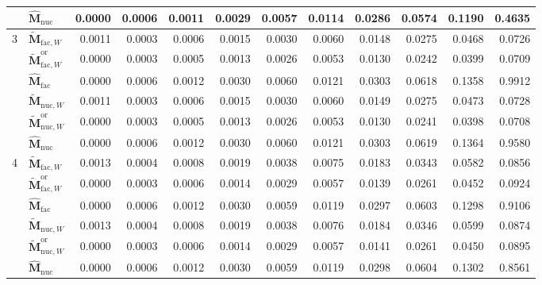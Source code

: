 \documentclass[numsec,webpdf,modern,large,namedate]{oup-authoring-template}
\theoremstyle{plain}
\theoremstyle{remark}
\newcommand{\M}{\bm{M}}
\begin{document}
\begin{table}[!htbp]
{\begin{tabular}{@{}llrrrrrrrrrr@{}}
 & $\widehat{\M}_{\mathrm{nuc}}$ & 0.0000 & 0.0006 & 0.0011 & 0.0029 & 0.0057 & 0.0114 & 0.0286 & 0.0574 & 0.1190 & 0.4635 \\
\midrule
\multirow{6}{*}{3} & $\widetilde{\M}_{\mathrm{fac},W}$ & 0.0011 & 0.0003 & 0.0006 & 0.0015 & 0.0030 & 0.0060 & 0.0148 & 0.0275 & 0.0468 & 0.0726 \\
 & $\widetilde{\M}_{\mathrm{fac},W}^{\mathrm{or}}$ & 0.0000 & 0.0003 & 0.0005 & 0.0013 & 0.0026 & 0.0053 & 0.0130 & 0.0242 & 0.0399 & 0.0709 \\
 & $\widehat{\M}_{\mathrm{fac}}$ & 0.0000 & 0.0006 & 0.0012 & 0.0030 & 0.0060 & 0.0121 & 0.0303 & 0.0618 & 0.1358 & 0.9912 \\
 & $\widetilde{\M}_{\mathrm{nuc},W}$ & 0.0011 & 0.0003 & 0.0006 & 0.0015 & 0.0030 & 0.0060 & 0.0149 & 0.0275 & 0.0473 & 0.0728 \\
 & $\widetilde{\M}_{\mathrm{nuc},W}^{\mathrm{or}}$ & 0.0000 & 0.0003 & 0.0005 & 0.0013 & 0.0026 & 0.0053 & 0.0130 & 0.0241 & 0.0398 & 0.0708 \\
 & $\widehat{\M}_{\mathrm{nuc}}$ & 0.0000 & 0.0006 & 0.0012 & 0.0030 & 0.0060 & 0.0121 & 0.0303 & 0.0619 & 0.1364 & 0.9580 \\
\midrule
\multirow{6}{*}{4} & $\widetilde{\M}_{\mathrm{fac},W}$ & 0.0013 & 0.0004 & 0.0008 & 0.0019 & 0.0038 & 0.0075 & 0.0183 & 0.0343 & 0.0582 & 0.0856 \\
 & $\widetilde{\M}_{\mathrm{fac},W}^{\mathrm{or}}$ & 0.0000 & 0.0003 & 0.0006 & 0.0014 & 0.0029 & 0.0057 & 0.0139 & 0.0261 & 0.0452 & 0.0924 \\
 & $\widehat{\M}_{\mathrm{fac}}$ & 0.0000 & 0.0006 & 0.0012 & 0.0030 & 0.0059 & 0.0119 & 0.0297 & 0.0603 & 0.1298 & 0.9106 \\
 & $\widetilde{\M}_{\mathrm{nuc},W}$ & 0.0013 & 0.0004 & 0.0008 & 0.0019 & 0.0038 & 0.0076 & 0.0184 & 0.0346 & 0.0599 & 0.0874 \\
 & $\widetilde{\M}_{\mathrm{nuc},W}^{\mathrm{or}}$ & 0.0000 & 0.0003 & 0.0006 & 0.0014 & 0.0029 & 0.0057 & 0.0141 & 0.0261 & 0.0450 & 0.0895 \\
 & $\widehat{\M}_{\mathrm{nuc}}$ & 0.0000 & 0.0006 & 0.0012 & 0.0030 & 0.0059 & 0.0119 & 0.0298 & 0.0604 & 0.1302 & 0.8561 \\
\bottomrule
\end{tabular}
}
\endgroup
\end{table}
\end{document}
